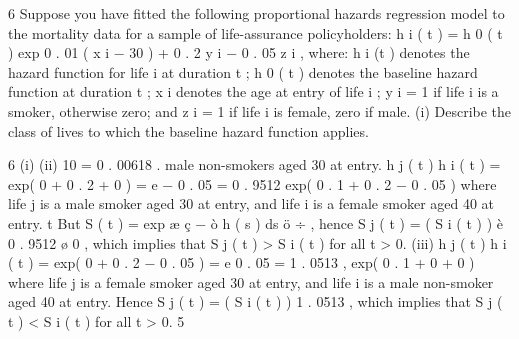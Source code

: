 \documentclass[a4paper,12pt]{article}
\begin{document}
6
Suppose you have fitted the following proportional hazards regression model to
the mortality data for a sample of life-assurance policyholders:
h i ( t ) = h 0 ( t ) exp { 0 . 01 ( x i − 30 ) + 0 . 2 y i − 0 . 05 z i } ,
where:
h i (t ) denotes the hazard function for life i at duration t ;
h 0 ( t ) denotes the baseline hazard function at duration t ;
x i denotes the age at entry of life i ;
y i = 1 if life i is a smoker, otherwise zero; and
z i = 1 if life i is female, zero if male.
(i)
Describe the class of lives to which the baseline hazard function applies.





\newpage


6
(i)
(ii)
10 = 0 . 00618 .
male non-smokers aged 30 at entry.
h j ( t )
h i ( t )
=
exp( 0 + 0 . 2 + 0 )
= e − 0 . 05 = 0 . 9512
exp( 0 . 1 + 0 . 2 − 0 . 05 )
where life j is a male smoker aged 30 at entry, and
life i is a female smoker aged 40 at entry.
t
But S ( t ) = exp æ ç − ò h ( s ) ds ö ÷ , hence
S j ( t ) = ( S i ( t ) )
è
0 . 9512
ø
0
, which implies that
S j ( t ) > S i ( t ) for all t > 0.
(iii)
h j ( t )
h i ( t )
=
exp( 0 + 0 . 2 − 0 . 05 )
= e 0 . 05 = 1 . 0513 ,
exp( 0 . 1 + 0 + 0 )
where life j is a female smoker aged 30 at entry, and
life i is a male non-smoker aged 40 at entry.
Hence S j ( t ) = ( S i ( t ) )
1 . 0513
, which implies that
S j ( t ) < S i ( t ) for all t > 0.
5
\end{document}
